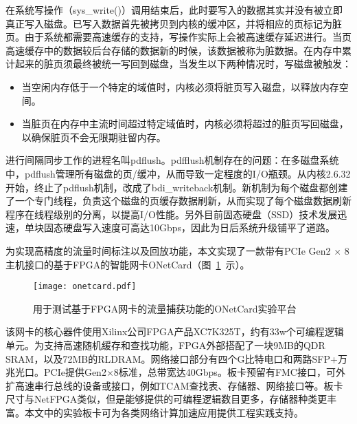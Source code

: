 在系统写操作（sys\_write()）调用结束后，此时要写入的数据其实并没有被立即真正写入磁盘。已写入数据首先被拷贝到内核的缓冲区，并将相应的页标记为脏页。由于系统都需要高速缓存的支持，写操作实际上会被高速缓存延迟进行。当页高速缓存中的数据较后台存储的数据新的时候，该数据被称为脏数据。在内存中累计起来的脏页须最终被统一写回到磁盘，当发生以下两种情况时，写磁盘被触发：

\begin{itemize}
	\item 当空闲内存低于一个特定的域值时，内核必须将脏页写入磁盘，以释放内存空间。
	\item 当脏页在内存中主流时间超过特定域值时，内核必须将超过的脏页写回磁盘，以确保脏页不会无限期驻留内存。
\end{itemize}

进行间隔同步工作的进程名叫pdflush。pdfflush机制存在的问题：在多磁盘系统中，pdflush管理所有磁盘的页/缓冲，从而导致一定程度的I/O瓶颈。从内核2.6.32开始，终止了pdflush机制，改成了bdi\_writeback机制。新机制为每个磁盘都创建了一个专门线程，负责这个磁盘的页缓存数据刷新，从而实现了每个磁盘数据刷新程序在线程级别的分离，以提高I/O性能。另外目前固态硬盘（SSD）技术发展迅速，单块固态硬盘写入速度可高达10Gbps，因此为日后系统升级铺平了道路。

\label{chap362}

为实现高精度的流量时间标注以及回放功能，本文实现了一款带有PCIe Gen2 $ \times $ 8主机接口的基于FPGA的智能网卡ONetCard（图~\ref{fig:onetcard}~示）。

\begin{figure}[!ht]
	\centering 
	\vspace{-1.5mm}
	\texttt{[image: onetcard.pdf]}
	\caption{用于测试基于FPGA网卡的流量捕获功能的ONetCard实验平台} \label{fig:onetcard}
\end{figure}

该网卡的核心器件使用Xilinx公司FPGA产品XC7K325T，约有33w个可编程逻辑单元。为支持高速随机缓存和查找功能，FPGA外部搭配了一块9MB的QDR SRAM，以及72MB的RLDRAM。网络接口部分有四个G比特电口和两路SFP+万兆光口。PCIe提供Gen2$\times$8标准，总带宽达40Gbps。板卡预留有FMC接口，可外扩高速串行总线的设备或接口，例如TCAM查找表、存储器、网络接口等。板卡尺寸与NetFPGA类似，但是能够提供的可编程逻辑数目更多，存储器种类更丰富。本文中的实验板卡可为各类网络计算加速应用提供工程实践支持。

\label{chap37}


